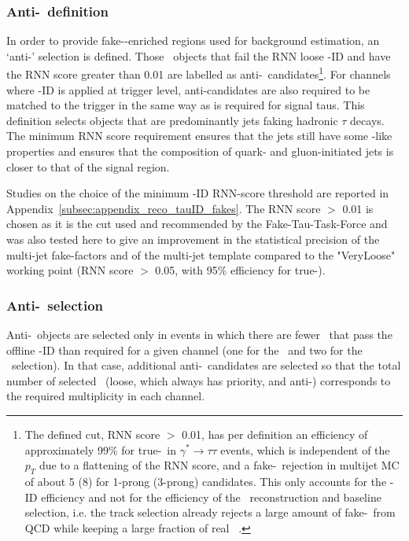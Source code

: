 \subsubsection{Anti-\tauhad\ definition}
\label{subsec:taus_antitaus}
In order to provide fake-\tauhad-enriched regions used for background estimation, an `anti-\tauhad' selection is defined. Those \tauhadvis\ objects that fail the RNN loose \tauhad-ID and have the RNN score greater than 0.01 are labelled as anti-\tauhad\ candidates\footnote{The defined cut, RNN score $>$ 0.01, has per definition an efficiency of approximately 99\% for true-\tauhad\ in $\gamma^*\rightarrow \tau\tau$ events, which is independent of the \tauhadvis\ $p_T$ due to a flattening of the RNN score, and a fake-\tauhad\ rejection in multijet MC of about 5 (8) for 1-prong (3-prong) candidates. This only accounts for the \tauhad-ID efficiency and not for the efficiency of the \tauhad\ reconstruction and baseline selection, i.e. the track selection already rejects a large amount of fake-\tauhad\ from QCD while keeping a large fraction of real \tauhad~\cite{ATL-PHYS-PUB-2019-033}.}.
For channels where \tauhad-ID is applied at trigger level, anti-\tauhad candidates are also required to be matched to the trigger \tauhad in the same way as is required for signal taus.
This definition selects objects that are predominantly jets faking hadronic $\tau$ decays. The minimum RNN score requirement ensures that the jets still have some \tauhad-like properties and ensures that the composition of quark- and gluon-initiated jets is closer to that of the signal region.

Studies on the choice of the minimum \tauhad-ID RNN-score threshold are reported in Appendix~\ref{subsec:appendix_reco_tauID_fakes}. The RNN score $>$ 0.01 is chosen as it is the cut used and recommended by the Fake-Tau-Task-Force and was also tested here to give an improvement in the statistical precision of the multi-jet fake-factors and of the multi-jet template compared to the "VeryLoose" working point (RNN score $>$ 0.05, with 95\% efficiency for true-\tauhad).

\subsubsection{Anti-\tauhad\ selection}
\label{subsec:taus_randomtausel}
Anti-\tauhad\ objects are selected only in events in which there are fewer \tauhad\ that pass the offline \tauhad-ID than required for a given channel (one for the \lephad\ and two for the \hadhad\ selection). In that case, additional anti-\tauhad\ candidates are selected so that the total number of selected \tauhad\ (loose, which always has priority, and anti-\tauhad) corresponds to the required multiplicity in each channel.

